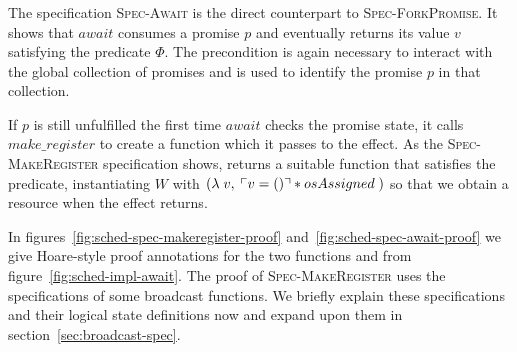 \subsubsection{}
\label{sec:sched-spec-await}

The specification \textsc{Spec-Await} is the direct counterpart to \textsc{Spec-ForkPromise}.
It shows that \(await\) consumes a promise \(p\) and eventually returns its value \(v\) satisfying the predicate \(\Phi\).
The precondition \gsPInv{} is again necessary to interact with the global collection of promises and \gsIsPr{} is used to identify the promise \(p\) in that collection.

If \(p\) is still unfulfilled the first time \(await\) checks the promise state, it calls \(make\_register\) to create a  function which it passes to the \esuspend{} effect.
As the \textsc{Spec-MakeRegister} specification shows,  returns a suitable function that satisfies the \gsIsReg{} predicate, instantiating \(W\) with \((\lambda\; v,\; \ulcorner v = () \urcorner \ast osAssigned\;)\) so that we obtain a \gspdone{} resource when the effect returns.


In figures~\ref{fig:sched-spec-makeregister-proof} and~\ref{fig:sched-spec-await-proof} we give Hoare-style proof annotations for the two functions  and  from figure~\ref{fig:sched-impl-await}.
The proof of \textsc{Spec-MakeRegister} uses the specifications of some broadcast functions.
We briefly explain these specifications and their logical state definitions now and expand upon them in section~\ref{sec:broadcast-spec}.

